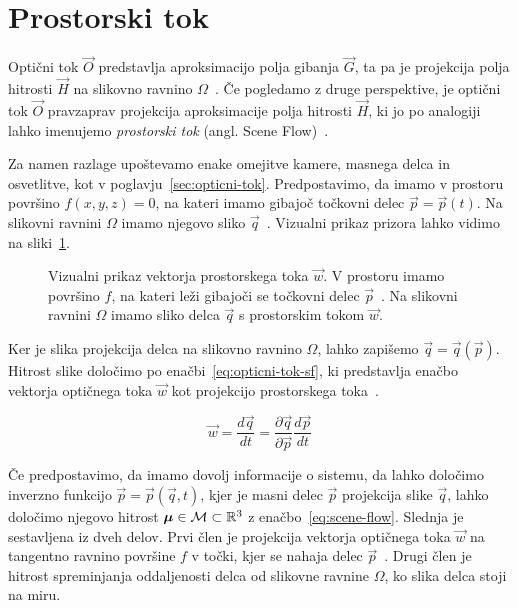 \section{Prostorski tok}
Optični tok $\vec{O}$ predstavlja aproksimacijo polja gibanja $\vec{G}$, ta pa je projekcija polja hitrosti $\vec{H}$ na slikovno ravnino $\varOmega$~\cite{trucco1998introductory}. Če pogledamo z druge perspektive, je optični tok $\vec{O}$ pravzaprav projekcija aproksimacije polja hitrosti $\vec{H}$, ki jo po analogiji lahko imenujemo \emph{prostorski tok} (angl. Scene Flow)~\cite{vedula1999three}.

Za namen razlage upoštevamo enake omejitve kamere, masnega delca in osvetlitve, kot v poglavju~\ref{sec:opticni-tok}. Predpostavimo, da imamo v prostoru površino $f(x,y,z) = 0$, na kateri imamo gibajoč točkovni delec $\vec{p} = \vec{p}(t)$. Na slikovni ravnini $\varOmega$ imamo njegovo sliko $\vec{q}$~\cite{vedula1999three}. Vizualni prikaz prizora lahko vidimo na sliki~\ref{fig:scene-flow}. 




\begin{figure}[htb]
\centering

\caption[Vizualni prikaz vektorja prostorskega toka $\vec{w}$]{Vizualni prikaz vektorja prostorskega toka $\vec{w}$. V prostoru imamo površino $f$, na kateri leži gibajoči se točkovni delec $\vec{p}$~\cite{vedula1999three}. Na slikovni ravnini $\varOmega$ imamo sliko delca $\vec{q}$ s prostorskim tokom $\vec{w}$.}
\label{fig:scene-flow}
\end{figure}



Ker je slika projekcija delca na slikovno ravnino $\varOmega$, lahko zapišemo $\vec{q} = \vec{q}(\vec{p})$. Hitrost slike določimo po enačbi~\eqref{eq:opticni-tok-sf}, ki predstavlja enačbo vektorja optičnega toka $\vec{w}$ kot projekcijo prostorskega toka~\cite{vedula1999three}. 


\begin{equation}\label{eq:opticni-tok-sf}
	\vec{w} = \frac{d\vec{q}}{dt} = \frac{\partial \vec{q}}{\partial \vec{p}}\frac{d\vec{p}}{dt}
\end{equation}

Če predpostavimo, da imamo dovolj informacije o sistemu, da lahko določimo inverzno funkcijo $\vec{p} = \vec{p}(\vec{q},t)$, kjer je masni delec $\vec{p}$ projekcija slike $\vec{q}$, lahko določimo njegovo hitrost ${\boldsymbol{\mu}} \in \mathcal{M} \subset \mathbb{R}^3$ z enačbo~\eqref{eq:scene-flow}. Slednja je sestavljena iz dveh delov. Prvi člen je projekcija vektorja optičnega toka $\vec{w}$ na tangentno ravnino površine $f$ v točki, kjer se nahaja delec $\vec{p}$~\cite{vedula1999three}. Drugi člen je hitrost spreminjanja oddaljenosti delca od slikovne ravnine $\varOmega$, ko slika delca stoji na miru. 


